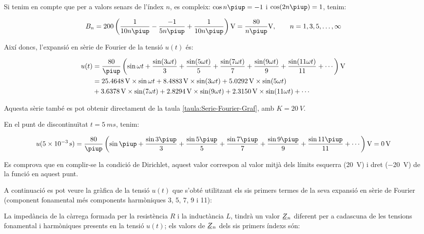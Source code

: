 \begin{exemple}
    Si tenim en compte que per a valors senars de l'índex $n$, es
    compleix: $\cos n \piup = -1$ i $\cos (2 n \piup) = 1$, tenim:

    \[
        B_n = 200 \left( \frac{1}{10 n \piup} - \frac{-1}{5 n \piup} +
        \frac{1}{10 n \piup} \right) \unit{V} = \frac{80}{n \piup} \unit{V},
        \qquad n=1,3,5,\ldots,\infty
    \]

    Així doncs, l'expansió en sèrie de Fourier de la tensió $u(t)$ és:

    \[\begin{split}
        u(t) &= \frac{80}{\piup} \left( \sin \omega t + \frac{\sin (3 \omega t)}{3} +
        \frac{\sin (5 \omega t)}{5} + \frac{\sin (7 \omega t)}{7} +
        \frac{\sin (9 \omega t)}{9} + \frac{\sin (11 \omega t)}{11} +\cdots\right) \unit{V}\\
        &= \qty{25,4648}{V} \times \sin \omega t + \qty{8,4883}{V} \times \sin (3 \omega t) + \qty{5,0292}{V} \times \sin (5 \omega t) \\
        &+ \qty{3,6378}{V} \times \sin (7 \omega t) + \qty{2,8294}{V} \times \sin (9 \omega t) + \qty{2,3150}{V} \times \sin (11 \omega t) +\cdots
    \end{split}\]

  
    Aquesta sèrie també es pot obtenir directament de la taula \vref{taula:Serie-Fourier-Graf}, amb $K=\qty{20}{V}$.

    En el punt de discontinuïtat $t=\qty{5}{ms}$, tenim:

    \[
        u(\qty{5e-3}{s}) =\frac{80}{\piup} \left( \sin \piup + \frac{\sin 3 \piup}{3} +
        \frac{\sin 5 \piup}{5} + \frac{\sin 7 \piup}{7} +
        \frac{\sin 9 \piup}{9} +\frac{\sin 11 \piup}{11}+\cdots\right) \unit{V}= \qty{0}{V}
    \]

    Es comprova que en complir-se la condició de Dirichlet, aquest valor
    correspon al valor mitjà dels límits esquerra (\qty{20}{V}) i dret (\qty{-20}{V})  de
    la funció en aquest punt.

    A continuació es pot veure la gràfica de la tensió $u(t)$ que
    s'obté utilitzant els sis primers termes de la seva expansió en sèrie de Fourier (component fonamental més components harmòniques 3, 5, 7, 9 i 11):

    \begin{center}
        
    \end{center}

    La impedància de la càrrega formada per la resistència $R$ i la
    inductància $L$, tindrà un valor $\cmplx{Z}_n$ diferent per a
    cadascuna de les tensions fonamental i harmòniques presents en la
    tensió $u(t)$; els valors de $\cmplx{Z}_n$ dels sis primers índexs són:
    

\end{exemple}
